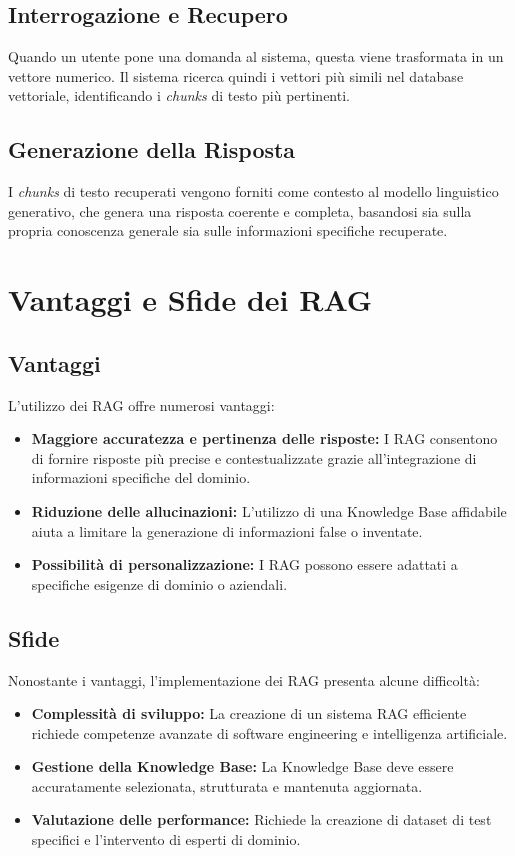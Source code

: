 \documentclass[12pt,a4paper,openright,twoside]{book}
\begin{document}
\section{Interrogazione e Recupero}
Quando un utente pone una domanda al sistema, questa viene trasformata in un vettore numerico. Il sistema ricerca quindi i vettori pi\`u simili nel database vettoriale, identificando i \textit{chunks} di testo pi\`u pertinenti.

\section{Generazione della Risposta}
I \textit{chunks} di testo recuperati vengono forniti come contesto al modello linguistico generativo, che genera una risposta coerente e completa, basandosi sia sulla propria conoscenza generale sia sulle informazioni specifiche recuperate.

\chapter{Vantaggi e Sfide dei RAG}

\section{Vantaggi}
L'utilizzo dei RAG offre numerosi vantaggi:
\begin{itemize}
    \item \textbf{Maggiore accuratezza e pertinenza delle risposte:} I RAG consentono di fornire risposte pi\`u precise e contestualizzate grazie all'integrazione di informazioni specifiche del dominio.
    \item \textbf{Riduzione delle allucinazioni:} L'utilizzo di una Knowledge Base affidabile aiuta a limitare la generazione di informazioni false o inventate.
    \item \textbf{Possibilit\`a di personalizzazione:} I RAG possono essere adattati a specifiche esigenze di dominio o aziendali.
\end{itemize}

\section{Sfide}
Nonostante i vantaggi, l'implementazione dei RAG presenta alcune difficolt\`a:
\begin{itemize}
    \item \textbf{Complessit\`a di sviluppo:} La creazione di un sistema RAG efficiente richiede competenze avanzate di software engineering e intelligenza artificiale.
    \item \textbf{Gestione della Knowledge Base:} La Knowledge Base deve essere accuratamente selezionata, strutturata e mantenuta aggiornata.
    \item \textbf{Valutazione delle performance:} Richiede la creazione di dataset di test specifici e l'intervento di esperti di dominio.
\end{itemize}
\end{document}
